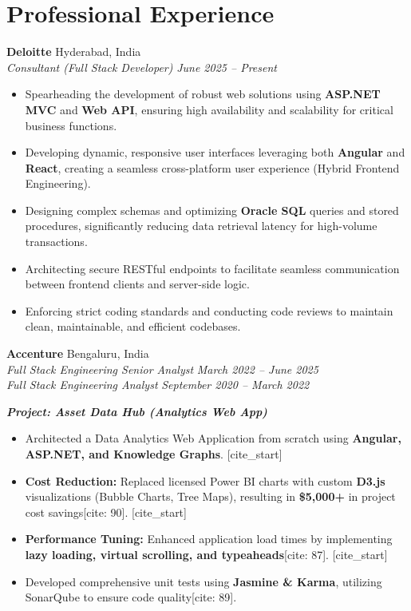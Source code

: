 \documentclass[a4paper,10pt]{article}
\begin{document}
\section{Professional Experience}

\textbf{Deloitte} \hfill Hyderabad, India \\
\textit{Consultant (Full Stack Developer)} \hfill \textit{June 2025 -- Present}
\begin{itemize}[leftmargin=*, noitemsep]
    \item Spearheading the development of robust web solutions using \textbf{ASP.NET MVC} and \textbf{Web API}, ensuring high availability and scalability for critical business functions.
    \item Developing dynamic, responsive user interfaces leveraging both \textbf{Angular} and \textbf{React}, creating a seamless cross-platform user experience (Hybrid Frontend Engineering).
    \item Designing complex schemas and optimizing \textbf{Oracle SQL} queries and stored procedures, significantly reducing data retrieval latency for high-volume transactions.
    \item Architecting secure RESTful endpoints to facilitate seamless communication between frontend clients and server-side logic.
    \item Enforcing strict coding standards and conducting code reviews to maintain clean, maintainable, and efficient codebases.
\end{itemize}

\vspace{6pt}

\textbf{Accenture} \hfill Bengaluru, India \\
\textit{Full Stack Engineering Senior Analyst} \hfill \textit{March 2022 -- June 2025} \\
\textit{Full Stack Engineering Analyst} \hfill \textit{September 2020 -- March 2022}

\textbf{\textit{Project: Asset Data Hub (Analytics Web App)}}
\begin{itemize}[leftmargin=*, noitemsep]
    \item Architected a Data Analytics Web Application from scratch using \textbf{Angular, ASP.NET, and Knowledge Graphs}.
    [cite_start]\item \textbf{Cost Reduction:} Replaced licensed Power BI charts with custom \textbf{D3.js} visualizations (Bubble Charts, Tree Maps), resulting in \textbf{\$5,000+} in project cost savings[cite: 90].
    [cite_start]\item \textbf{Performance Tuning:} Enhanced application load times by implementing \textbf{lazy loading, virtual scrolling, and typeaheads}[cite: 87].
    [cite_start]\item Developed comprehensive unit tests using \textbf{Jasmine \& Karma}, utilizing SonarQube to ensure code quality[cite: 89].
\end{itemize}
\end{document}
